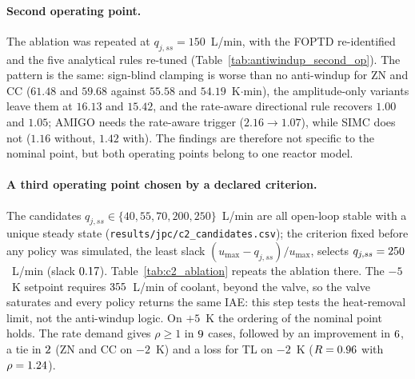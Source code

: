 \documentclass[11pt]{article}
\begin{document}
\paragraph{Second operating point.} The ablation was repeated at $q_{j,ss} = 150$~L/min, with the FOPTD re-identified and the five analytical rules re-tuned (Table~\ref{tab:antiwindup_second_op}). The pattern is the same: sign-blind clamping is worse than no anti-windup for ZN and CC ($61.48$ and $59.68$ against $55.58$ and $54.19$~K$\cdot$min), the amplitude-only variants leave them at $16.13$ and $15.42$, and the rate-aware directional rule recovers $1.00$ and $1.05$; AMIGO needs the rate-aware trigger ($2.16 \rightarrow 1.07$), while SIMC does not ($1.16$ without, $1.42$ with). The findings are therefore not specific to the nominal point, but both operating points belong to one reactor model.



\paragraph{A third operating point chosen by a declared criterion.} The candidates $q_{j,ss} \in \{40, 55, 70, 200, 250\}$~L/min are all open-loop stable with a unique steady state (\texttt{results/jpc/c2\_candidates.csv}); the criterion fixed before any policy was simulated, the least slack $(u_{\max} - q_{j,ss})/u_{\max}$, selects $q_{j,ss} = 250$~L/min (slack $0.17$). Table~\ref{tab:c2_ablation} repeats the ablation there. The $-5$~K setpoint requires $355$~L/min of coolant, beyond the valve, so the valve saturates and every policy returns the same IAE: this step tests the heat-removal limit, not the anti-windup logic. On $+5$~K the ordering of the nominal point holds. The rate demand gives $\rho \ge 1$ in $9$ cases, followed by an improvement in $6$, a tie in $2$ (ZN and CC on $-2$~K) and a loss for TL on $-2$~K ($R = 0.96$ with $\rho = 1.24$).


\end{document}
